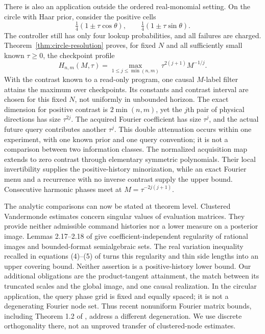 There is also an application outside the ordered real-monomial setting.
On the circle with Haar prior, consider the positive cells
\[
 \tfrac14(1\pm\tau\cos\theta),\qquad
 \tfrac14(1\pm\tau\sin\theta).
\]
The controller still has only four lookup probabilities, and all failures
are charged. Theorem~\ref{thm:circle-resolution} proves, for fixed $N$
and all sufficiently small known $\tau\ge0$, the checkpoint profile
\[
 H_{n,m}(M,\tau)=
 \max_{1\le j\le\min(n,m)}\tau^{2(j+1)}M^{-1/j}.
\]
With the contrast known to a read-only program, one causal $M$-label
filter attains the maximum over checkpoints. Its constants and
contrast interval are chosen for this fixed $N$, not uniformly in
unbounded horizon. The
exact dimension for positive contrast is $2\min(n,m)$, yet the $j$th
pair of physical directions has size $\tau^{2j}$. The acquired Fourier
coefficient has size $\tau^j$, and the actual future query contributes
another $\tau^j$. This double attenuation occurs within one experiment,
with one known prior and one query convention; it is not a comparison
between two information classes. The normalized acquisition map extends
to zero contrast through elementary symmetric polynomials. Their local
invertibility supplies the positive-history minorization, while an exact
Fourier menu and a recurrence with no inverse contrast supply the upper
bound. Consecutive harmonic phases meet at
$M=\tau^{-2j(j+1)}$.

The analytic comparisons can now be stated at theorem level.
Clustered Vandermonde estimates \cite{BatenkovEtAl}
concern singular values of evaluation matrices. They provide neither
admissible command histories nor a lower measure on a posterior image.
Lemmas 2.17--2.18 of \cite{ZhangKileel} give coefficient-independent
regularity of rational images and bounded-format semialgebraic sets.
The real variation inequality recalled in equations (4)--(5) of
\cite{ComteHalupczok} turns this regularity and thin side lengths into
an upper covering bound. Neither assertion is a positive-history lower
bound. Our additional obligations are the product-tangent attainment,
the match between its truncated scales and the global image, and one
causal realization. In the circular application, the query phase grid
is fixed and equally spaced; it is not a degenerating Fourier node set.
Thus recent nonuniform Fourier matrix bounds, including Theorem 1.2 of
\cite{ChenLinZhang}, address a different degeneration. We use discrete
orthogonality there, not an unproved transfer of clustered-node estimates.



